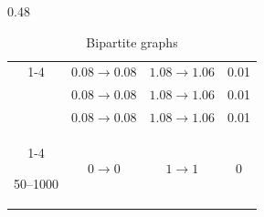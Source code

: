 \begin{table}[h!]
\begin{subtable}[t]{0.48\textwidth}
\begin{tabular}{c|c|c|c}
                    \cmidrule(lr){1-4}
        
                    \multirow{3}{*}{20}
                        & $0.08 \rightarrow 0.08$ & $1.08 \rightarrow 1.06$ & 0.01 \\
                        & $0.08 \rightarrow 0.08$ & $1.08 \rightarrow 1.06$ & 0.01 \\
                        & $0.08 \rightarrow 0.08$ & $1.08 \rightarrow 1.06$ & 0.01 \\
        
                    \cmidrule(lr){1-4}
        
                    50--1000 & $0 \rightarrow 0$ & $1 \rightarrow 1$ & 0 \\
                    \bottomrule
                \end{tabular}
                \caption*{Bipartite graphs}
            \end{subtable}
        \end{table}

